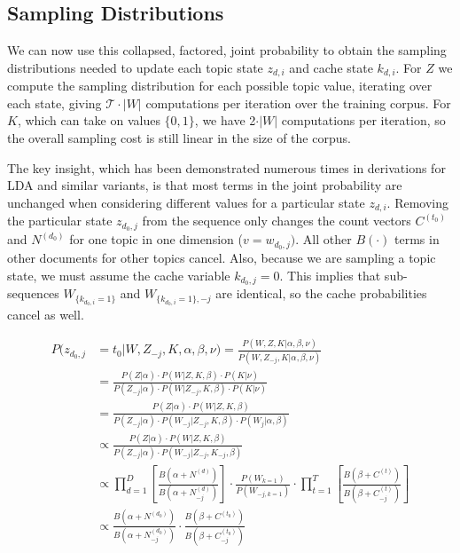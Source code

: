 \subsection{Sampling Distributions}
We can now use this collapsed, factored, joint probability to obtain the sampling distributions needed to update each topic state $z_{d,i}$ and cache state $k_{d,i}$.  For $Z$ we compute the sampling distribution for each possible topic value, iterating over each state, giving $\mathcal{T}\cdot|W|$ computations per iteration over the training corpus.   For $K$, which can take on values $\{0,1\}$, we have 2$\cdot|W|$ computations per iteration, so the overall sampling cost is still linear in the size of the corpus.

The key insight, which has been demonstrated numerous times in derivations for  LDA and similar variants, is that most terms in the joint probability are unchanged when considering different values for a particular state $z_{d,i}$.  Removing the particular state $z_{d_0,j}$ from the sequence only changes the count vectors $C^{(t_0)}$ and $N^{(d_0)}$ for one topic in one dimension ($v=w_{d_0,j})$.  All other $B(\cdot)$ terms in other documents for other topics cancel.  Also, because we are sampling a topic state, we must assume the cache variable $k_{d_0,j}=0$.  This implies that sub-sequences $W_{\{k_{d_0,i}=1\}}$ and $W_{\{k_{d_0,i}=1\},-j}$ are identical, so the cache probabilities cancel as well.

\begin{align}
P(z_{d_0,j}&=t_0|W,Z_{-j},K,\alpha,\beta,\nu) = \frac{P(W,Z,K|\alpha,\beta,\nu)}{P(W,Z_{-j},K|\alpha,\beta,\nu)} \label{zsampler3} \\
&= \frac{P(Z|\alpha) \cdot P(W|Z,K,\beta) \cdot P(K|\nu)}{P(Z_{-j}|\alpha) \cdot P(W|Z_{-j},K,\beta) \cdot P(K|\nu)}  \\
&= \frac{P(Z|\alpha)\cdot P(W|Z,K,\beta)}{P(Z_{-j}|\alpha) \cdot P(W_{-j}|Z_{-j},K,\beta) \cdot P(W_j|\alpha,\beta)} \\
&\propto \frac{P(Z|\alpha)\cdot P(W|Z,K,\beta)}{P(Z_{-j}|\alpha) \cdot P(W_{-j}|Z_{-j},K_{-j},\beta)} \label{samplerUnnorm2} \\
&\propto \prod_{d=1}^{D} \left [ \frac{B(\alpha +  N^{(d)})}{B(\alpha +  N^{(d)}_{-j}) } \right ] \cdot \frac{P(W_{k=1})}{P(W_{-j,k=1}) } \cdot \prod_{t=1}^T \left [ \frac{B(\beta + C^{(t)})}{B(\beta + C^{(t)}_{-j}) } \right ]  \\
&\propto \frac{B(\alpha +  N^{(d_0)})}{B(\alpha +  N^{(d_0)}_{-j})} \cdot \frac{B(\beta + C^{(t_0)})}{B(\beta + C^{(t_0)}_{-j})}
\end{align}


